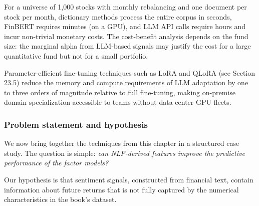 \bigskip

For a universe of 1,000 stocks with monthly rebalancing and one document per stock per month, dictionary methods process the entire corpus in seconds, FinBERT requires minutes (on a GPU), and LLM API calls require hours and incur non-trivial monetary costs. The cost-benefit analysis depends on the fund size: the marginal alpha from LLM-based signals may justify the cost for a large quantitative fund but not for a small portfolio.

Parameter-efficient fine-tuning techniques such as LoRA and QLoRA (see Section 23.5) reduce the memory and compute requirements of LLM adaptation by one to three orders of magnitude relative to full fine-tuning, making on-premise domain specialization accessible to teams without data-center GPU fleets.

\subsubsection{Problem statement and hypothesis}

We now bring together the techniques from this chapter in a structured case study. The question is simple: \textit{can NLP-derived features improve the predictive performance of the factor models?}

Our hypothesis is that sentiment signals, constructed from financial text, contain information about future returns that is not fully captured by the numerical characteristics in the book's dataset.

